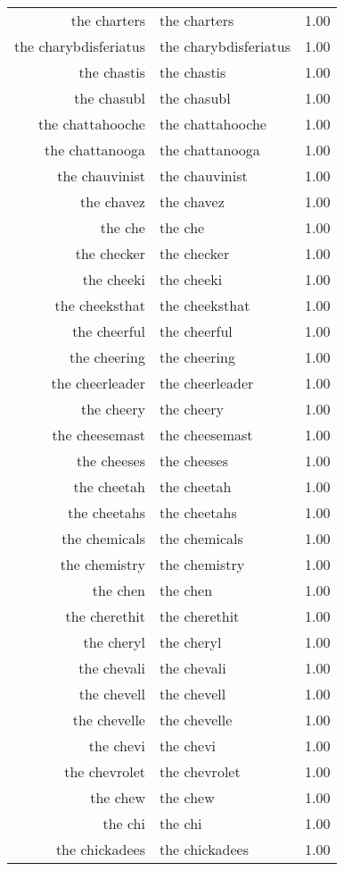 \begin{table}[ht]
\begin{tabular}{rlr}
  the charters & the charters & 1.00 \\ 
  the charybdisferiatus & the charybdisferiatus & 1.00 \\ 
  the chastis & the chastis & 1.00 \\ 
  the chasubl & the chasubl & 1.00 \\ 
  the chattahooche & the chattahooche & 1.00 \\ 
  the chattanooga & the chattanooga & 1.00 \\ 
  the chauvinist & the chauvinist & 1.00 \\ 
  the chavez & the chavez & 1.00 \\ 
  the che & the che & 1.00 \\ 
  the checker & the checker & 1.00 \\ 
  the cheeki & the cheeki & 1.00 \\ 
  the cheeksthat & the cheeksthat & 1.00 \\ 
  the cheerful & the cheerful & 1.00 \\ 
  the cheering & the cheering & 1.00 \\ 
  the cheerleader & the cheerleader & 1.00 \\ 
  the cheery & the cheery & 1.00 \\ 
  the cheesemast & the cheesemast & 1.00 \\ 
  the cheeses & the cheeses & 1.00 \\ 
  the cheetah & the cheetah & 1.00 \\ 
  the cheetahs & the cheetahs & 1.00 \\ 
  the chemicals & the chemicals & 1.00 \\ 
  the chemistry & the chemistry & 1.00 \\ 
  the chen & the chen & 1.00 \\ 
  the cherethit & the cherethit & 1.00 \\ 
  the cheryl & the cheryl & 1.00 \\ 
  the chevali & the chevali & 1.00 \\ 
  the chevell & the chevell & 1.00 \\ 
  the chevelle & the chevelle & 1.00 \\ 
  the chevi & the chevi & 1.00 \\ 
  the chevrolet & the chevrolet & 1.00 \\ 
  the chew & the chew & 1.00 \\ 
  the chi & the chi & 1.00 \\ 
  the chickadees & the chickadees & 1.00 \\ 

\end{tabular}
\end{table}
